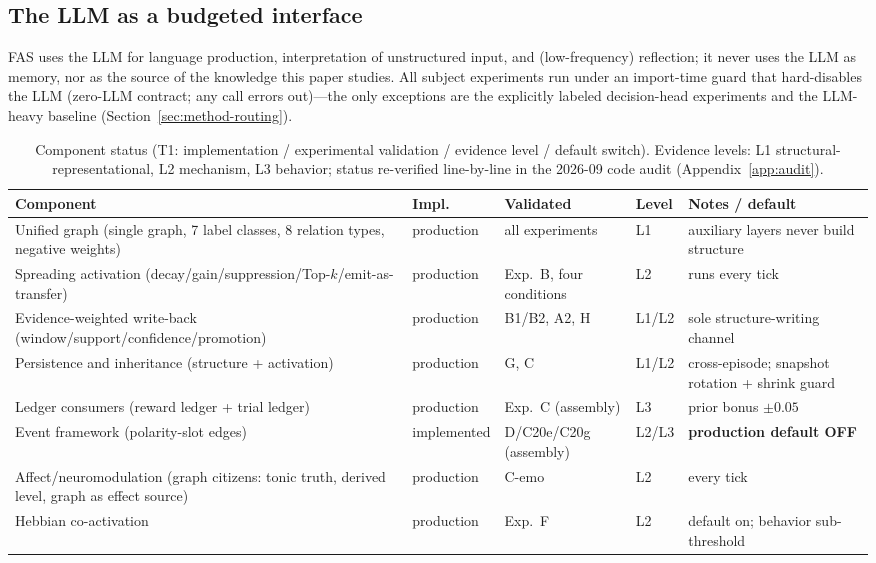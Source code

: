 \documentclass[10pt,a4paper]{article}
\begin{document}
\subsection{The LLM as a budgeted interface}
\label{sec:arch-llm}
FAS uses the LLM for language production, interpretation of unstructured input, and (low-frequency) reflection; it never uses the LLM as memory, nor as the source of the knowledge this paper studies. All subject experiments run under an import-time guard that hard-disables the LLM (zero-LLM contract; any call errors out)---the only exceptions are the explicitly labeled decision-head experiments and the LLM-heavy baseline (Section~\ref{sec:method-routing}).

\begin{table}[t]
\centering\small
\caption{Component status (T1: implementation / experimental validation / evidence level / default switch). Evidence levels: L1 structural-representational, L2 mechanism, L3 behavior; status re-verified line-by-line in the 2026-09 code audit (Appendix~\ref{app:audit}).}
\label{tab:components}
\begin{tabular}{L{3.6cm}L{1.9cm}L{1.9cm}L{1.4cm}L{3.9cm}}
\toprule
\textbf{Component} & \textbf{Impl.} & \textbf{Validated} & \textbf{Level} & \textbf{Notes / default} \\
\midrule
Unified graph (single graph, 7 label classes, 8 relation types, negative weights) & production & all experiments & L1 & auxiliary layers never build structure \\
Spreading activation (decay/gain/suppression/Top-$k$/emit-as-transfer) & production & Exp.\ B, four conditions & L2 & runs every tick \\
Evidence-weighted write-back (window/support/confidence/promotion) & production & B1/B2, A2, H & L1/L2 & sole structure-writing channel \\
Persistence and inheritance (structure + activation) & production & G, C & L1/L2 & cross-episode; snapshot rotation + shrink guard \\
Ledger consumers (reward ledger + trial ledger) & production & Exp.\ C (assembly) & L3 & prior bonus $\pm0.05$ \\
Event framework (polarity-slot edges) & implemented & D/C20e/C20g (assembly) & L2/L3 & \textbf{production default OFF} \\
Affect/neuromodulation (graph citizens: tonic truth, derived level, graph as effect source) & production & C-emo & L2 & every tick \\
Hebbian co-activation & production & Exp.\ F & L2 & default on; behavior sub-threshold \\

\end{tabular}
\end{table}
\end{document}
